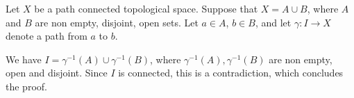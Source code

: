 \documentclass[12pt]{article}
\begin{document}
Let $X$ be a path connected topological space. Suppose that $X = A \cup B$, where $A$ and $B$ are non empty, disjoint, open sets. Let $a \in A$, $b \in B$, and let $\gamma: I \rightarrow X$ denote a path from $a$ to $b$.

We have $I = \gamma^{-1}(A) \cup \gamma^{-1}(B)$, where $\gamma^{-1}(A),\gamma^{-1}(B)$ are non empty, open and disjoint. Since $I$ is connected, this is a contradiction, which concludes the proof.
\end{document}

